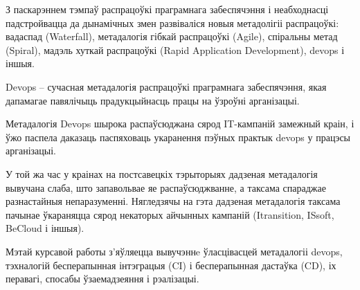 \sectionWithoutNumber{\prefacename}
З паскарэннем тэмпаў распрацоўкі праграмнага забеспячэння і
неабходнасці падстройвацца да дынамічных змен
развіваліся новыя метадолігіі распрацоўкі: вадаспад (Waterfall),
метадалогія гібкай распрацоўкі (Agile), спіральны метад (Spiral),
мадэль хуткай распрацоўкі (Rapid Application Development), devops і іншыя.


Devops -- сучасная метадалогія распрацоўкі праграмнага забеспячэння, якая
дапамагае павялічыць прадукцыйнасць працы на ўзроўні арганізацыі.

Метадалогія Devops шырока распаўсюджана сярод IT-кампаній замежный краін,
і ўжо паспела даказаць паспяховаць укаранення пэўных практык devops
у працэсы арганізацыі.

У той жа час у краінах на постсавецкіх тэрыторыях дадзеная метадалогія
вывучана слаба, што запавольвае яе распаўсюджванне, а таксама спараджае
разнастайныя непаразуменні.
Нягледзячы на гэта дадзеная метадалогія таксама пачынае ўкараняцца сярод
некаторых ай\-чын\-ных кампаній (Itransition, ISsoft, BeCloud і іншыя).

Мэтай курсавой работы з'яўляецца вывучэннe ўласцівасцей метадалогіі devops,
тэхналогій бесперапынная інтэграцыя (CI) і бесперапынная дастаўка (CD),
іх перавагі, спосабы ўзаемадзеяння і рэалізацыі.

\clearpage
